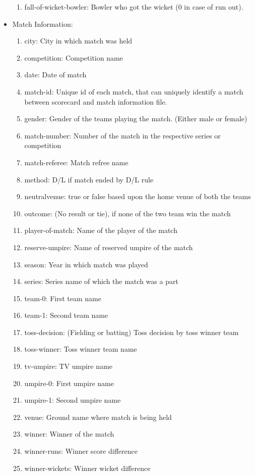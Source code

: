 \documentclass[fleqn,10pt]{wlscirep}
\begin{document}
\begin{itemize}
\begin{enumerate}
    \item fall-of-wicket-bowler: Bowler who got the wicket (0 in case of run out).
\end{enumerate}
\item Match Information:
\begin{enumerate}
    \item city: City in which match was held
    \item competition: Competition name
    \item date: Date of match
    \item match-id: Unique id of each match, that can uniquely identify a match between scorecard and match information file.
    \item gender: Gender of the teams playing the match. (Either male or female)
    \item match-number: Number of the match in the respective series or competition
    \item match-referee: Match refree name
    \item method: D/L if match ended by D/L rule
    \item neutralvenue: true or false based upon the home venue of both the teams
    \item outcome: (No result or tie), if none of the two team win the match
    \item player-of-match: Name of the player of the match
    \item reserve-umpire: Name of reserved umpire of the match
    \item season: Year in which match was played
    \item series: Series name of which the match was a part
    \item team-0: First team name
    \item team-1: Second team name
    \item toss-decision: (Fielding or batting) Toss decision by toss winner team
    \item toss-winner: Toss winner team name
    \item tv-umpire: TV umpire name
    \item umpire-0: First umpire name
    \item umpire-1: Second umpire name
    \item venue: Ground name where match is being held
    \item winner: Winner of the match
    \item winner-runs: Winner score difference
    \item winner-wickets: Winner wicket difference
\end{enumerate}
\end{itemize}
\end{document}

